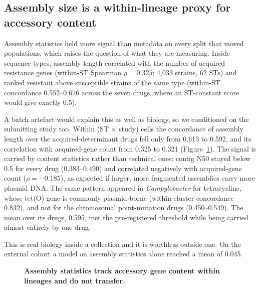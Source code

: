 \subsection*{Assembly size is a within-lineage proxy for accessory content}

Assembly statistics held more signal than metadata on every split that moved populations, which
raises the question of what they are measuring. Inside sequence types, assembly length correlated
with the number of acquired resistance genes (within-ST Spearman $\rho = 0.325$; 4,033 strains, 62
STs) and ranked resistant above susceptible strains of the same type (within-ST concordance
0.552--0.676 across the seven drugs, where an ST-constant score would give exactly 0.5).

A batch artefact would explain this as well as biology, so we conditioned on the submitting study
too. Within (ST $\times$ study) cells the concordance of assembly length over the
acquired-determinant drugs fell only from 0.613 to 0.592, and its correlation with acquired-gene
count from 0.325 to 0.321 (Figure~\ref{fig:assembly}). The signal is carried by content statistics
rather than technical ones: contig N50 stayed below 0.5 for every drug (0.383--0.490) and
correlated negatively with acquired-gene count ($\rho = -0.185$), as expected if larger, more
fragmented assemblies carry more plasmid DNA. The same pattern appeared in \textit{Campylobacter}
for tetracycline, whose tet(O) gene is commonly plasmid-borne \cite{iovine2013campylobacter}
(within-cluster concordance 0.832), and not for the chromosomal point-mutation drugs
(0.450--0.549). The mean over its drugs, 0.595, met the pre-registered threshold while being
carried almost entirely by one drug.

This is real biology inside a collection and it is worthless outside one. On the external cohort a
model on assembly statistics alone reached a mean \nap{} of 0.045.

\begin{figure}[t]\centering
{}
\caption{\textbf{Assembly statistics track accessory gene content within lineages and do not
transfer.} }\label{fig:assembly}
\end{figure}

